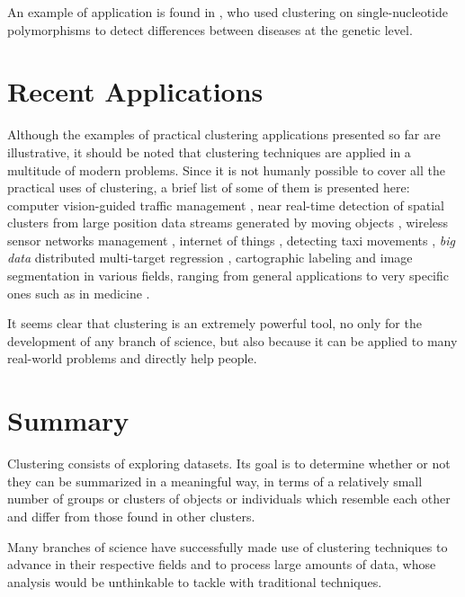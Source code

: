 An example of application is found in \cite{selinski2008cluster}, who used clustering on single-nucleotide polymorphisms to detect differences between diseases at the genetic level.

\section{Recent Applications}

Although the examples of practical clustering applications presented so far are illustrative, it should be noted that clustering techniques are applied in a multitude of modern problems. Since it is not humanly possible to cover all the practical uses of clustering, a brief list of some of them is presented here: computer vision-guided traffic management \cite{kumaran2019computer}, near real-time detection of
spatial clusters from large position data streams generated
by moving objects \cite{junior2019dg2cep}, wireless sensor networks management \cite{wan2019similarity}, internet of things \cite{aranzazu2019anchor}, detecting taxi movements \cite{ibrahim2019detecting}, \textit{big data} distributed multi-target regression \cite{corizzo2019dencast},  cartographic labeling \cite{araujo2019improving} and image segmentation in various fields, ranging from general applications \cite{wang2018non} to very specific ones such as in medicine \cite{verma2016improved, aparajeeta2016modified}. 

It seems clear that clustering is an extremely powerful tool, no only for the development of any branch of science, but also because it can be applied to  many real-world problems and directly help people.

\section{Summary}

Clustering consists of exploring datasets. Its goal is to determine whether or not they can be summarized in a meaningful way, in terms of a relatively small number of groups or clusters of objects or individuals which resemble each other and differ from those found in other clusters.

Many branches of science have successfully made use of clustering techniques to advance in their respective fields and to process large amounts of data, whose analysis would be unthinkable to tackle with traditional techniques.





















